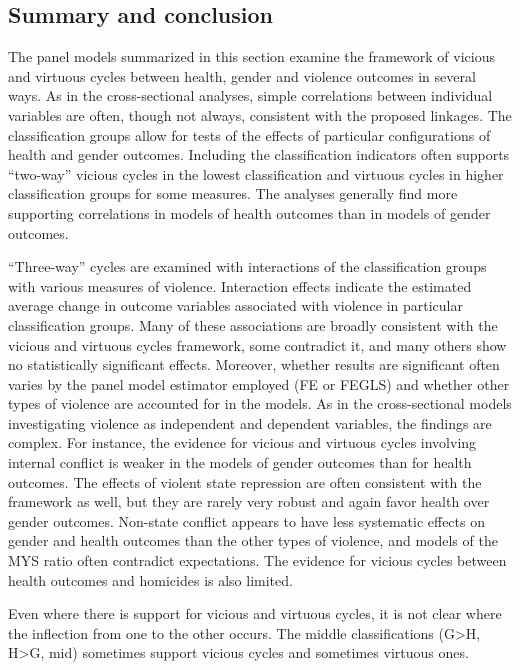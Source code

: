 \documentclass[12pt]{article}
\begin{document}
\clearpage
\subsection{Summary and conclusion}

The panel models summarized in this section examine the framework of vicious and virtuous cycles between health, gender and violence outcomes in several ways.
As in the cross-sectional analyses, simple correlations between individual variables are often, though not always, consistent with the proposed linkages.
The classification groups allow for tests of the effects of particular configurations of health and gender outcomes.
Including the classification indicators often supports \enquote{two-way} vicious cycles in the lowest classification and virtuous cycles in higher classification groups for some measures.
The analyses generally find more supporting correlations in models of health outcomes than in models of gender outcomes.

\enquote{Three-way} cycles are examined with interactions of the classification groups with various measures of violence.
Interaction effects indicate the estimated average change in outcome variables associated with violence in particular classification groups.
Many of these associations are broadly consistent with the vicious and virtuous cycles framework, some contradict it, and many others show no statistically significant effects.
Moreover, whether results are significant often varies by the panel model estimator employed (FE or FEGLS) and whether other types of violence are accounted for in the models.
As in the cross-sectional models investigating violence as independent and dependent variables, the findings are complex.
For instance, the evidence for vicious and virtuous cycles involving internal conflict is weaker in the models of gender outcomes than for health outcomes.
The effects of violent state repression are often consistent with the framework as well, but they are rarely very robust and again favor health over gender outcomes.
Non-state conflict appears to have less systematic effects on gender and health outcomes than the other types of violence, and models of the MYS ratio often contradict expectations.
The evidence for vicious cycles between health outcomes and homicides is also limited.

Even where there is support for vicious and virtuous cycles, it is not clear where the inflection from one to the other occurs. The middle classifications (G>H, H>G, mid) sometimes support vicious cycles and sometimes virtuous ones.
\end{document}
